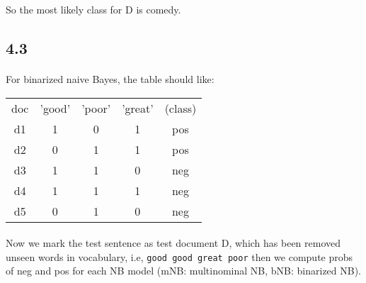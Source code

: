 \documentclass{article}
\begin{document}
So the most likely class for D is comedy.

\subsection*{4.3}
\paragraph*{}

For binarized naive Bayes, the table should like:
\begin{center}
    \begin{tabular}{c c c c c}
        doc & 'good' & 'poor' & 'great' & (class) \\
        d1  & 1      & 0      & 1       & pos     \\
        d2  & 0      & 1      & 1       & pos     \\
        d3  & 1      & 1      & 0       & neg     \\
        d4  & 1      & 1      & 1       & neg     \\
        d5  & 0      & 1      & 0       & neg     \\
    \end{tabular}
\end{center}

\paragraph*{}
Now we mark the test sentence as test document D, which has been removed unseen words in vocabulary, i.e,
\texttt{good good great poor}
then we compute probs of neg and pos for each NB model
(mNB: multinominal NB, bNB: binarized NB).
\end{document}
